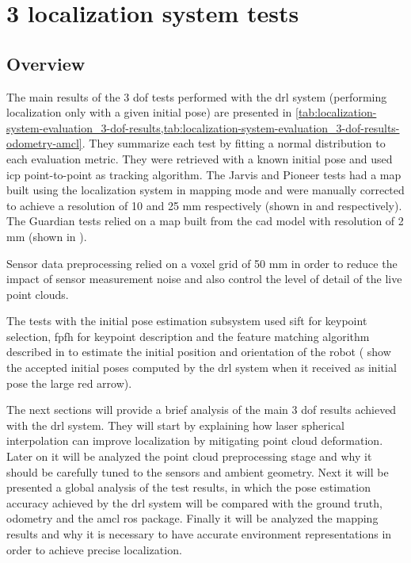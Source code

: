 \section{3  localization system tests}\label{sec:planar-localization-system-tests}


\subsection{Overview}

The main results of the 3 \gls{dof} tests performed with the \gls{drl} system (performing localization only with a given initial pose) are presented in \cref{tab:localization-system-evaluation_3-dof-results,tab:localization-system-evaluation_3-dof-results-odometry-amcl}. They summarize each test by fitting a normal distribution to each evaluation metric. They were retrieved with a known initial pose and used \gls{icp} point-to-point as tracking algorithm. The Jarvis and Pioneer tests had a map built using the localization system in mapping mode and were manually corrected to achieve a resolution of 10 and 25 mm respectively (shown in  and  respectively). The Guardian tests relied on a map built from the \gls{cad} model with resolution of 2 mm (shown in ).

Sensor data preprocessing relied on a voxel grid of 50 mm in order to reduce the impact of sensor measurement noise and also control the level of detail of the live point clouds.

The tests with the initial pose estimation subsystem used \gls{sift} for keypoint selection, \gls{fpfh} for keypoint description and the feature matching algorithm described in  to estimate the initial position and orientation of the robot ( show the accepted initial poses computed by the \gls{drl} system when it received as initial pose the large red arrow).

The next sections will provide a brief analysis of the main 3 \gls{dof} results achieved with the \gls{drl} system. They will start by explaining how laser spherical interpolation can improve localization by mitigating point cloud deformation. Later on it will be analyzed the point cloud preprocessing stage and why it should be carefully tuned to the sensors and ambient geometry. Next it will be presented a global analysis of the test results, in which the pose estimation accuracy achieved by the \gls{drl} system will be compared with the ground truth, odometry and the \gls{amcl} \gls{ros} package. Finally it will be analyzed the mapping results and why it is necessary to have accurate environment representations in order to achieve precise localization.


